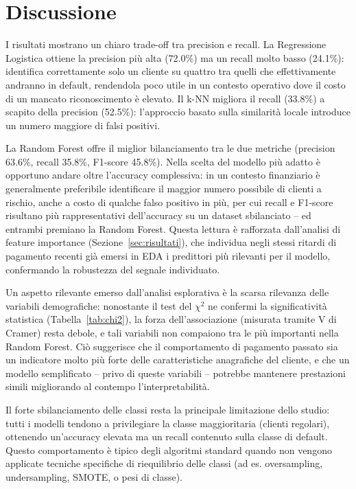 \documentclass[11pt,a4paper]{article}
\begin{document}
\newpage
\section{Discussione}
\label{sec:discussione}

I risultati mostrano un chiaro trade-off tra precision e recall. La Regressione Logistica ottiene la precision più alta (72.0\%) ma un recall molto basso (24.1\%): identifica correttamente solo un cliente su quattro tra quelli che effettivamente andranno in default, rendendola poco utile in un contesto operativo dove il costo di un mancato riconoscimento è elevato. Il k-NN migliora il recall (33.8\%) a scapito della precision (52.5\%): l'approccio basato sulla similarità locale introduce un numero maggiore di falsi positivi.

La Random Forest offre il miglior bilanciamento tra le due metriche (precision 63.6\%, recall 35.8\%, F1-score 45.8\%). Nella scelta del modello più adatto è opportuno andare oltre l'accuracy complessiva: in un contesto finanziario è generalmente preferibile identificare il maggior numero possibile di clienti a rischio, anche a costo di qualche falso positivo in più, per cui recall e F1-score risultano più rappresentativi dell'accuracy su un dataset sbilanciato -- ed entrambi premiano la Random Forest. Questa lettura è rafforzata dall'analisi di feature importance (Sezione~\ref{sec:risultati}), che individua negli stessi ritardi di pagamento recenti già emersi in EDA i predittori più rilevanti per il modello, confermando la robustezza del segnale individuato.

Un aspetto rilevante emerso dall'analisi esplorativa è la scarsa rilevanza delle variabili demografiche: nonostante il test del $\chi^2$ ne confermi la significatività statistica (Tabella~\ref{tab:chi2}), la forza dell'associazione (misurata tramite V di Cramer) resta debole, e tali variabili non compaiono tra le più importanti nella Random Forest. Ciò suggerisce che il comportamento di pagamento passato sia un indicatore molto più forte delle caratteristiche anagrafiche del cliente, e che un modello semplificato -- privo di queste variabili -- potrebbe mantenere prestazioni simili migliorando al contempo l'interpretabilità.

Il forte sbilanciamento delle classi resta la principale limitazione dello studio: tutti i modelli tendono a privilegiare la classe maggioritaria (clienti regolari), ottenendo un'accuracy elevata ma un recall contenuto sulla classe di default. Questo comportamento è tipico degli algoritmi standard quando non vengono applicate tecniche specifiche di riequilibrio delle classi (ad es. oversampling, undersampling, SMOTE, o pesi di classe).
\end{document}
